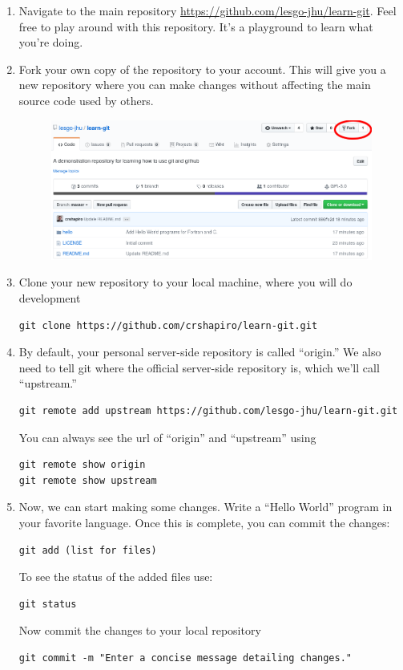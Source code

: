 \documentclass{article}
\begin{document}
\begin{enumerate}
\item Navigate to the main repository \href{https://github.com/lesgo-jhu/learn-git}{https://github.com/lesgo-jhu/learn-git}. Feel free to play around with this repository. It's a playground to learn what you're doing.
\item Fork your own copy of the repository to your account. This will give you a new repository where you can make changes without affecting the main source code used by others.
\begin{figure}[h!]
\centering
\includegraphics[width=\textwidth]{fork.png}
\end{figure}
\item Clone your new repository to your local machine, where you will do development
\begin{lstlisting}
git clone https://github.com/crshapiro/learn-git.git
\end{lstlisting}

\item By default, your personal server-side repository is called ``origin.'' We also need to tell git where the official server-side repository is, which we'll call ``upstream.''
\begin{lstlisting}
git remote add upstream https://github.com/lesgo-jhu/learn-git.git
\end{lstlisting}
You can always see the url of ``origin'' and ``upstream'' using
\begin{lstlisting}
git remote show origin
git remote show upstream
\end{lstlisting}

\item Now, we can start making some changes. Write a ``Hello World'' program in your favorite language. Once this is complete, you can commit the changes:
\begin{lstlisting}
git add (list for files)
\end{lstlisting}
To see the status of the added files use:
\begin{lstlisting}
git status
\end{lstlisting}
Now commit the changes to your local repository
\begin{lstlisting}
git commit -m "Enter a concise message detailing changes."
\end{lstlisting}


\end{enumerate}
\end{document}

